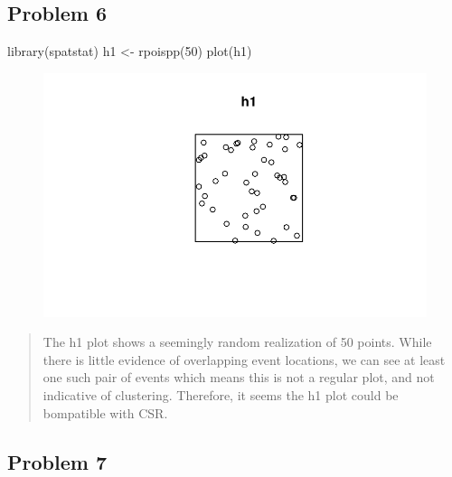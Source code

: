 \documentclass[
  letterpaper,
  DIV=11,
  numbers=noendperiod]{scrartcl}
\newenvironment{Shaded}{\begin{snugshade}}{\end{snugshade}}
\newcommand{\DecValTok}[1]{\textcolor[rgb]{0.68,0.00,0.00}{#1}}
\newcommand{\FunctionTok}[1]{\textcolor[rgb]{0.28,0.35,0.67}{#1}}
\newcommand{\NormalTok}[1]{\textcolor[rgb]{0.00,0.23,0.31}{#1}}
\newcommand{\OtherTok}[1]{\textcolor[rgb]{0.00,0.23,0.31}{#1}}
\begin{document}
\hypertarget{problem-6}{%
\subsection{Problem 6}\label{problem-6}}

\begin{Shaded}
\begin{Highlighting}[]
\FunctionTok{library}\NormalTok{(spatstat)}
\NormalTok{h1 }\OtherTok{\textless{}{-}} \FunctionTok{rpoispp}\NormalTok{(}\DecValTok{50}\NormalTok{)}
\FunctionTok{plot}\NormalTok{(h1)}
\end{Highlighting}
\end{Shaded}

\begin{figure}[H]

{\centering \includegraphics{robby_homework_1---Copy_files/figure-pdf/unnamed-chunk-6-1.pdf}

}

\end{figure}

\begin{quote}
The h1 plot shows a seemingly random realization of 50 points. While
there is little evidence of overlapping event locations, we can see at
least one such pair of events which means this is not a regular plot,
and not indicative of clustering. Therefore, it seems the h1 plot could
be bompatible with CSR.
\end{quote}

\hypertarget{problem-7}{%
\subsection{Problem 7}\label{problem-7}}
\end{document}
